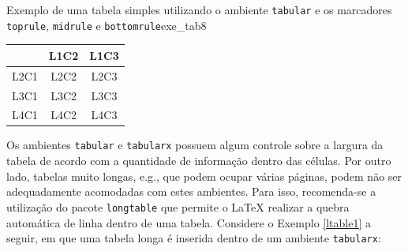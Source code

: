 \begin{texexptitled}[breakable,center lower,enhanced,middle=2mm]{Exemplo de uma tabela simples utilizando o ambiente {\tt tabular} e os marcadores {\tt toprule}, {\tt midrule} e {\tt bottomrule}}{exe_tab8}
\begin{tabular}[t]{lcc}
\toprule
     & L1C2 & L1C3 \\
\midrule
L2C1 & L2C2 & L2C3 \\
L3C1 & L3C2 & L3C3 \\
L4C1 & L4C2 & L4C3 \\
\bottomrule
\end{tabular}
\end{texexptitled}


Os ambientes {\tt tabular} e {\tt tabularx} possuem algum controle sobre a largura da tabela de acordo com a quantidade de informação dentro das células. Por outro lado, tabelas muito longas, e.g., que podem ocupar várias páginas, podem não ser adequadamente acomodadas com estes ambientes. Para isso, recomenda-se a utilização do pacote {\tt longtable} que permite o \LaTeX{} realizar a quebra automática de linha dentro de uma tabela. Considere o Exemplo \ref{ltable1} a seguir, em que uma tabela longa é inserida dentro de um ambiente {\tt tabularx}:



